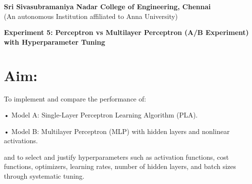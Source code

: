 \documentclass[11pt]{article}
\begin{document}
   \begin{center}
    \large \textbf{Sri Sivasubramaniya Nadar College of Engineering, Chennai} \\
    (An autonomous Institution affiliated to Anna University) \\
    \vspace{0.3cm}
\end{center}

\begin{table}[!h]
\renewcommand{\arraystretch}{1.5}
\end{table}

\vspace{0.5cm}

\begin{center}
 \textbf{Experiment 5: Perceptron vs Multilayer Perceptron (A/B Experiment) with Hyperparameter Tuning}
\end{center}

\vspace{0.4cm}
\noindent
\section{Aim:} 
 To implement and compare the performance of:
 
 • Model A: Single-Layer Perceptron Learning Algorithm (PLA).
 
 • Model B: Multilayer Perceptron (MLP) with hidden layers and nonlinear activations.
 
 and to select and justify hyperparameters such as activation functions, cost functions, optimizers, learning rates, number of hidden layers, and batch sizes through systematic tuning.

\vspace{0.4cm}
\noindent
\end{document}
